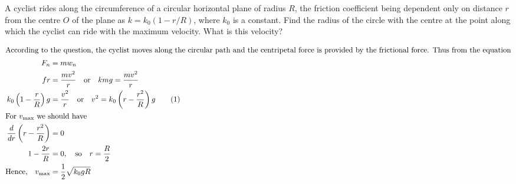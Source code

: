 \item A cyclist rides along the circumference of a circular horizontal plane of radius \(R\), the friction coefficient being dependent only on distance \(r\) from the centre \(O\) of the plane as \( k = k_0 (1 - r/R) \), where \( k_0 \) is a constant. Find the radius of the circle with the centre at the point along which the cyclist can ride with the maximum velocity. What is this velocity?
    \begin{center}
    \end{center}

\begin{solution}
    \begin{center}
    \end{center}
    
    \begin{align*}
        \intertext{According to the question, the cyclist moves along the circular path and the centripetal force is provided by the frictional force. Thus from the equation}
        F_n &= mw_n\\
        fr &= \dfrac{mv^2}{r} \quad \text{or} \quad kmg = \dfrac{mv^2}{r}\\
        k_0 \left( 1 - \dfrac{r}{R} \right) g &= \dfrac{v^2}{r} \quad \text{or} \quad v^2 = k_0 \left( r - \dfrac{r^2}{R} \right) g \tag{1}\\
        \intertext{For $v_{\text{max}}$ we should have}
        \dfrac{d}{dr} \left( r - \dfrac{r^2}{R} \right) &= 0\\
        1 - \dfrac{2r}{R} &= 0, \quad \text{so} \quad r = \dfrac{R}{2}\\
        \text{Hence,} \quad v_{\text{max}} &= \dfrac{1}{2} \sqrt{k_0 gR}
    \end{align*}
\end{solution}
